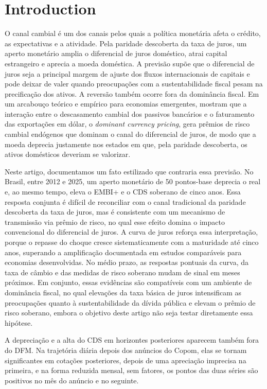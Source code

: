 \documentclass[preprint,authoryear,review,12pt]{elsarticle}
\begin{document}
\section{Introduction}
O canal cambial é um dos canais pelos quais a política monetária afeta o crédito, as expectativas e a atividade. Pela paridade descoberta da taxa de juros, um aperto monetário amplia o diferencial de juros doméstico, atrai capital estrangeiro e aprecia a moeda doméstica. A previsão supõe que o diferencial de juros seja a principal margem de ajuste dos fluxos internacionais de capitais e pode deixar de valer quando preocupações com a sustentabilidade fiscal pesam na precificação dos ativos. A reversão também ocorre fora da dominância fiscal. Em um arcabouço teórico e empírico para economias emergentes, \cite{dalgicozhan2026} mostram que a interação entre o descasamento cambial dos passivos bancários e o faturamento das exportações em dólar, o \textit{dominant currency pricing}, gera prêmios de risco cambial endógenos que dominam o canal do diferencial de juros, de modo que a moeda deprecia justamente nos estados em que, pela paridade descoberta, os ativos domésticos deveriam se valorizar.

Neste artigo, documentamos um fato estilizado que contraria essa previsão. No Brasil, entre 2012 e 2025, um aperto monetário de 50 pontos-base deprecia o real e, ao mesmo tempo, eleva o EMBI+ e o CDS soberano de cinco anos. Essa resposta conjunta é difícil de reconciliar com o canal tradicional da paridade descoberta da taxa de juros, mas é consistente com um mecanismo de transmissão via prêmio de risco, no qual esse efeito domina o impacto convencional do diferencial de juros. A curva de juros reforça essa interpretação, porque o repasse do choque cresce sistematicamente com a maturidade até cinco anos, superando a amplificação documentada em estudos comparáveis para economias desenvolvidas. No médio prazo, as respostas pontuais da curva, da taxa de câmbio e das medidas de risco soberano mudam de sinal em meses próximos. Em conjunto, essas evidências são compatíveis com um ambiente de dominância fiscal, no qual elevações da taxa básica de juros intensificam as preocupações quanto à sustentabilidade da dívida pública e elevam o prêmio de risco soberano, embora o objetivo deste artigo não seja testar diretamente essa hipótese.

A depreciação e a alta do CDS em horizontes posteriores aparecem também fora do DFM. Na trajetória diária depois dos anúncios do Copom, elas se tornam significantes em cotações posteriores, depois de uma apreciação imprecisa na primeira, e na forma reduzida mensal, sem fatores, os pontos das duas séries são positivos no mês do anúncio e no seguinte.
\end{document}
